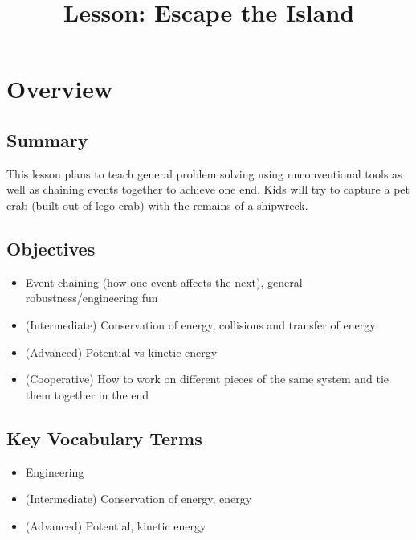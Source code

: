 \documentclass{lessonplan}
\title{\lessonNumber Lesson: Escape the Island}
\author{\linkHome}
\date{}
\begin{document}
  \maketitle

  \section{Overview}
    \subsection{Summary}
      This lesson plans to teach general problem solving using unconventional
      tools as well as chaining events together to achieve one end. Kids will
      try to capture a pet crab (built out of lego crab) with the remains
      of a shipwreck.

    \subsection{Objectives}
    \begin{itemize}
      \item Event chaining (how one event affects the next),
      general robustness/engineering fun
      \item (Intermediate) Conservation of energy, collisions and transfer
      of energy
      \item (Advanced) Potential vs kinetic energy
      \item (Cooperative) How to work on different pieces of the same system
      and tie them together in the end
    \end{itemize}

    \subsection{Key Vocabulary Terms}
    \begin{itemize}
      \item Engineering
      \item (Intermediate) Conservation of energy, energy
      \item (Advanced) Potential, kinetic energy
    \end{itemize}
\end{document}
